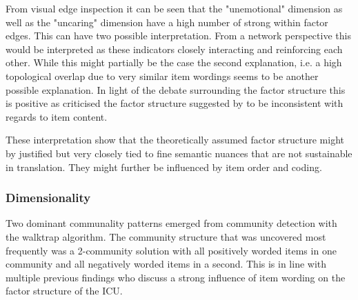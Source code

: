 From visual edge inspection it can be seen that the "unemotional" dimension as well as the "uncaring" dimension have a high number of strong within factor edges. This can have two possible interpretation. From a network perspective this would be interpreted as these indicators closely interacting and reinforcing each other. While this might partially be the case the second explanation, i.e. a high topological overlap due to very similar item wordings seems to be another possible explanation. In light of the debate surrounding the factor structure this is positive as \textcites{kliem_factor_2019} criticised the factor structure suggested by \textcites{essau_callous-unemotional_2006}
to be inconsistent with regards to item content.

These interpretation show that the theoretically assumed factor structure might by justified but very closely tied to fine semantic nuances that are not sustainable in translation. 
They might further be influenced by item order and coding.
 
 
\subsubsection{Dimensionality}
Two dominant communality patterns emerged from community detection with the walktrap algorithm.
The community structure that was uncovered most frequently was a 2-community solution with all positively worded items in one community and all negatively worded items in a second.
This is in line with multiple previous findings who discuss a strong influence of item wording on the factor structure of the ICU.

